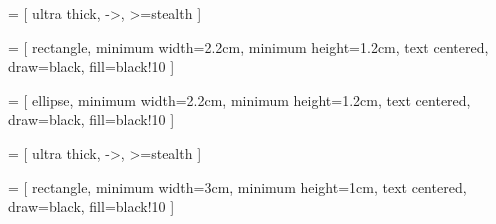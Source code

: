  = [
    ultra thick,
    ->,
    >=stealth
]

 = [
    rectangle,
    minimum width=2.2cm,
    minimum height=1.2cm,
    text centered,
    draw=black,
    fill=black!10
]

\usetikzlibrary{shapes}
 = [
    ellipse,
    minimum width=2.2cm,
    minimum height=1.2cm,
    text centered,
    draw=black,
    fill=black!10
]

%
%

 = [
    ultra thick,
    ->,
    >=stealth
]



 = [
    rectangle,
    minimum width=3cm,
    minimum height=1cm,
    text centered,
    draw=black,
    fill=black!10
]


